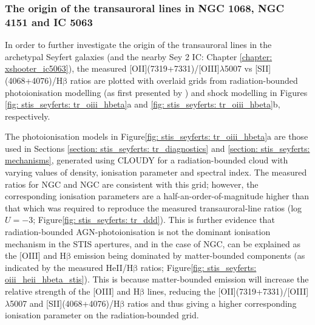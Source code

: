 \subsubsection{The origin of the transauroral lines in NGC 1068, NGC 4151 and IC 5063}

In order to further investigate the origin of the transauroral lines in the archetypal Seyfert galaxies (and the nearby Sey 2 IC: Chapter \ref{chapter: xshooter_ic5063}), the measured [OII](7319+7331)/[OIII]$\lambda$5007 vs [SII](4068+4076)/H$\mathrm{\beta}$ ratios are plotted with overlaid grids from radiation-bounded photoionisation modelling (as first presented by \citealt{Spence2018}) and shock modelling in Figures \ref{fig: stis_seyferts: tr_oiii_hbeta}a and \ref{fig: stis_seyferts: tr_oiii_hbeta}b, respectively. 

The photoionisation models in Figure\;\ref{fig: stis_seyferts: tr_oiii_hbeta}a are those used in Sections \ref{section: stis_seyferts: tr_diagnostics} and \ref{section: stis_seyferts: mechanisms}, generated using \textsc{CLOUDY} for a radiation-bounded cloud with varying values of density, ionisation parameter and spectral index. The measured ratios for NGC and NGC are consistent with this grid; however, the corresponding ionisation parameters are a half-an-order-of-magnitude higher than that which was required to reproduce the measured transauroral-line ratios (log\;$U=-3$; Figure\;\ref{fig: stis_seyferts: tr_ddd}). This is further evidence that radiation-bounded AGN-photoionisation is not the dominant ionisation mechanism in the STIS apertures, and in the case of NGC, can be explained as the [OIII] and H$\mathrm{\beta}$ emission being dominated by matter-bounded components (as indicated by the measured HeII/H$\mathrm{\beta}$ ratios; Figure\;\ref{fig: stis_seyferts: oiii_heii_hbeta_stis}). This is because matter-bounded emission will increase the relative strength of the [OIII] and H$\mathrm{\beta}$ lines, reducing the [OII](7319+7331)/[OIII]$\lambda$5007 and [SII](4068+4076)/H$\mathrm{\beta}$ ratios and thus giving a higher corresponding ionisation parameter on the radiation-bounded grid.


